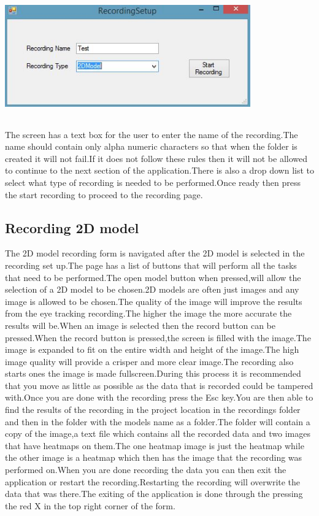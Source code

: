 \includegraphics[width=400px,height=200px]{./Images/Recordingsetup.JPG}

The screen has a text box for the user to enter the name of the recording.The name should contain only alpha numeric characters so that when the folder is created it will not fail.If it does not follow these rules then it will not be allowed to continue to the next section of the application.There is also a drop down list to select what type of recording is needed to be performed.Once ready then press the start recording to proceed to the recording page.
\subsection{Recording 2D model}
The 2D model recording form is navigated after the 2D model is selected in the recording set up.The page has a list of buttons that will perform all the tasks that need to be performed.The open model button when pressed,will allow the selection of a 2D model to be chosen.2D models are often just images and any image is allowed to be chosen.The quality of the image will improve the results from the eye tracking recording.The higher the image the more accurate the results will be.When an image is selected then the record button can be pressed.When the record button is pressed,the screen is filled with the image.The image is expanded to fit on the entire width and height of the image.The high image quality will provide a crisper and more clear image.The recording also starts ones the image is made fullscreen.During this process it is recommended that you move as little as possible as the data that is recorded could be tampered with.Once you are done with the recording press the Esc key.You are then able to find the results of the recording in the project location in the recordings folder and then in the folder with the models name as a folder.The folder will contain a copy of the image,a text file which contains all the recorded data and two images that have heatmaps on them.The one heatmap image is just the heatmap while the other image is a heatmap which then has the image that the recording was performed on.When you are done recording the data you can then exit the application or restart the recording.Restarting the recording will overwrite the data  that was there.The exiting of the application is done through the pressing the red X in the top right corner of the form.
